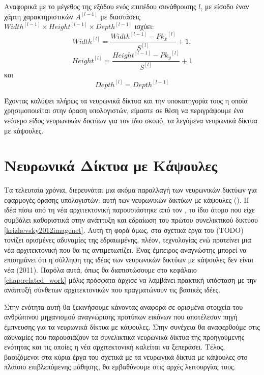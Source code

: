 Αναφορικά με το μέγεθος της εξόδου ενός επιπέδου συνάθροισης $l$, με είσοδο έναν χάρτη χαρακτηριστικών $A^{[l-1]}$ με διαστάσεις ${Width}^{[l-1]} \times {Height}^{[l-1]}\times{Depth}^{[l-1]}$ ισχύει:
\begin{equation}
  {Width}^{[l]}= \frac{{Width}^{[l-1]}-{Pk_x}^{[l]}}{S^{[l]}} + 1,
  \end{equation}
  \begin{equation}
    {Height}^{[l]}=\frac{{Height}^{[l-1]}-{Pk_y}^{[l]}}{S^{[l]}} + 1
  \end{equation}
  και
  \begin{equation}
    {Depth}^{[l]}={Depth}^{[l-1]}
  \end{equation}

Έχοντας καλύψει πλήρως τα νευρωνικά δίκτυα και την υποκατηγορία τους η οποία χρησιμοποιείται στην όραση υπολογιστών, είμαστε σε θέση να περιγράψουμε ένα νεότερο είδος νευρωνικών δικτύων για τον ίδιο σκοπό, τα λεγόμενα νευρωνικά δίκτυα με κάψουλες.

\section{Νευρωνικά Δίκτυα με Κάψουλες}
Τα τελευταία χρόνια, διερευνάται μια ακόμα παραλλαγή των νευρωνικών δικτύων για εφαρμογές όρασης υπολογιστών: αυτή των νευρωνικών δικτύων με κάψουλες (). Η ιδέα πίσω από τη νέα αρχιτεκτονική παρουσιάστηκε από τον , το ίδιο άτομο που είχε συμβάλει καθοριστικά στην ανάπτυξη και εδραίωση του πρώτου συνελικτικού δικτύου \ref{krizhevsky2012imagenet}. Αυτή τη φορά όμως, στα σχετικά έργα του (TODO) τονίζει ορισμένες αδυναμίες της εδραιωμένης, πλέον, τεχνολογίας ενώ προτείνει μια νέα αρχιτεκτονική που θα τις αντιμετωπίζει. Ένας έμπειρος αναγνώστης μπορεί να επισημάνει ότι η σύλληψη της ιδέας των νευρωνικών δικτύων με κάψουλες δεν είναι νέα (2011). Παρόλα αυτά, όπως θα διαπιστώσουμε στο κεφάλαιο \ref{chap:related_work} μόλις πρόσφατα άρχισε να λαμβάνει πρακτική υπόσταση με την ανάπτυξή σύνθετων αρχιτεκτονικών που πραγματώνουν τις βασικές ιδέες.\par

Στην ενότητα αυτή θα ξεκινήσουμε κάνοντας αναφορά σε ορισμένα στοιχεία του ανθρώπινου μηχανισμού αναγνώρισης προτύπων εικόνων που αποτέλεσαν πηγή έμπνευσης για τα νευρωνικά δίκτυα με κάψουλες. Στην συνέχεια θα αναφερθούμε στις αδυναμίες που παρουσιάζουν τα συνελικτικά νευρωνικά δίκτυα της προηγούμενης ενότητας και τις οποίες η νέα αρχιτεκτονική καλείται να ξεπεράσει. Τέλος, βασιζόμενοι στα κύρια έργα του  σχετικά με τα νευρωνικά δίκτυα με κάψουλες στο πλαίσιο επιβλεπόμενης μάθησης, θα εμβαθύνουμε στις αρχές λειτουργίας τους.\par

